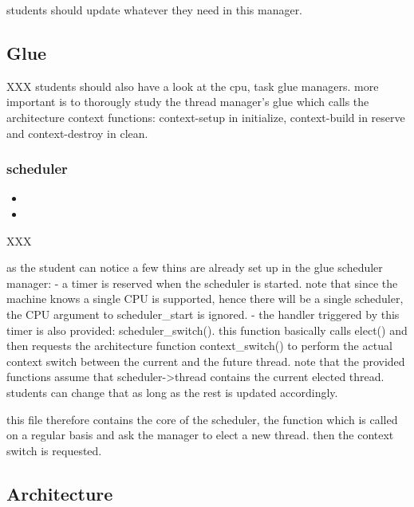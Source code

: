   students should update whatever they need in this manager.

%
%

\subsection{Glue}

XXX students should also have a look at the cpu, task glue managers. more
important is to thorougly study the thread manager's glue which calls the
architecture context functions: context-setup in initialize, context-build
in reserve and context-destroy in clean.

\subsubsection*{scheduler}

\begin{itemize}
  \item
  \item
\end{itemize}

XXX

as the student can notice a few thins are already set up in the glue
scheduler manager:
- a timer is reserved when the scheduler is started. note that since the
 machine knows a single CPU is supported, hence there will be a single
 scheduler, the CPU argument to scheduler\_start is ignored.
- the handler triggered by this timer is also provided: scheduler\_switch().
  this function basically calls elect() and then requests the architecture
  function context\_switch() to perform the actual context switch between
  the current and the future thread.
  note that the provided functions assume that scheduler->thread contains
  the current elected thread. students can change that as long as the rest
  is updated accordingly.

this file therefore contains the core of the scheduler, the function which
is called on a regular basis and ask the manager to elect a new thread. then
the context switch is requested.

%
%

\subsection{Architecture}

